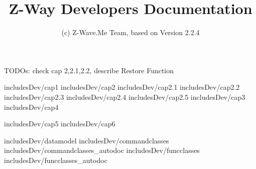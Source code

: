 \documentclass[10pt]{book}
\title{Z-Way Developers Documentation}
\author{(c) Z-Wave.Me Team, based on Version 2.2.4}
\date{}
\begin{document}
\maketitle
\tableofcontents


TODOs: check cap 2,2.1,2.2, describe Restore Function 

 {includesDev/cap1} 
 {includesDev/cap2} %
 {includesDev/cap2.1} %
 {includesDev/cap2.2} %
 {includesDev/cap2.3} %
 {includesDev/cap2.4} %
 {includesDev/cap2.5} %
 {includesDev/cap3} %
 {includesDev/cap4} %

 {includesDev/cap5} %
 {includesDev/cap6} %

 {includesDev/datamodel}
 {includesDev/commandclasses}
 {includesDev/commandclasses_autodoc}
 {includesDev/funcclasses}
 {includesDev/funcclasses_autodoc}
\end{document}
